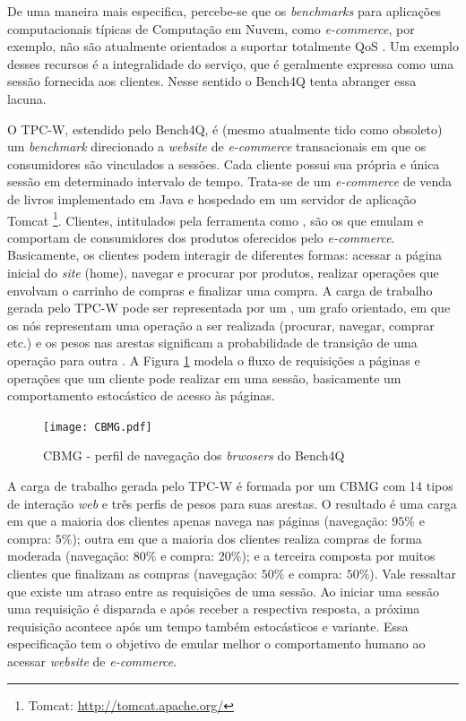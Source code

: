 De uma maneira mais especifica, percebe-se que os \textit{benchmarks} para aplicações computacionais típicas de Computação em Nuvem, como \textit{e-commerce}, por exemplo, não são atualmente orientados a suportar totalmente QoS %
\cite{Zhang2011}. Um exemplo desses recursos é a integralidade do serviço, que é geralmente expressa como uma sessão fornecida aos clientes. Nesse sentido o Bench4Q tenta abranger essa lacuna.


O TPC-W, estendido pelo Bench4Q, é (mesmo atualmente tido como obsoleto) um \textit{benchmark} direcionado a \textit{website} de \textit{e-commerce} transacionais em que os consumidores são vinculados a sessões. Cada cliente possui sua própria e única sessão em determinado intervalo de tempo. Trata-se de um \textit{e-commerce} de venda de livros implementado em Java e hospedado em um servidor de aplicação Tomcat \footnote{Tomcat: \url{http://tomcat.apache.org/}}. Clientes, intitulados pela ferramenta como , são os que emulam e comportam de consumidores dos produtos oferecidos pelo \textit{e-commerce}. Basicamente, os clientes podem interagir de diferentes formas: acessar a página inicial do \textit{site} (home), navegar e procurar por produtos, realizar operações que envolvam o carrinho de compras e finalizar uma compra. A carga de trabalho gerada pelo TPC-W pode ser representada por um , um grafo orientado, em que os nós representam uma operação a ser realizada (procurar, navegar, comprar etc.) e os pesos nas arestas significam a probabilidade de transição de uma operação para outra \cite{Zhang2011}. A Figura \ref{fig:CBMG} modela o fluxo de requisições a páginas e operações que um cliente pode realizar em uma sessão, basicamente um comportamento estocástico de acesso às páginas.

\begin{figure}[htb]
	\centering
	\texttt{[image: CBMG.pdf]}
	\caption{CBMG - perfil de navegação dos \textit{brwosers} do Bench4Q}
	\label{fig:CBMG}
\end{figure}


A carga de trabalho gerada pelo TPC-W é formada por um CBMG com 14 tipos de interação \textit{web} e três perfis de pesos para suas arestas. O resultado é uma carga em que a maioria dos clientes apenas navega nas páginas (navegação: $95\%$ e compra: $5\%$); outra em que a maioria dos clientes realiza compras de forma moderada (navegação: $80\%$ e compra: $20\%$); e a terceira composta por muitos clientes que finalizam as compras (navegação: $50\%$ e compra: $50\%$). Vale ressaltar que existe um atraso entre as requisições de uma sessão. Ao iniciar uma sessão uma requisição é disparada e após receber a respectiva resposta, a próxima requisição acontece após um tempo também estocásticos e variante. Essa especificação tem o objetivo de emular melhor o comportamento humano ao acessar \textit{website} de \textit{ e-commerce}.

